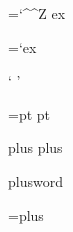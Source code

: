 \p@

\abovedisplayskip=`\^^Z ex

\abovedisplayskip=`\a ex


\thinspace=5pt

\negthinspace
\enspace
\enskip
\quad
\qquad
\smallskip
\medskip
\bigskip
\space
\empty
\null
\lq
\rq
\lbrack
\rbrack

\jota

\jot=pt
\jot=5pt pt

\jot=5pt plus plus

\jot=5pt plusword

\jot=plus

